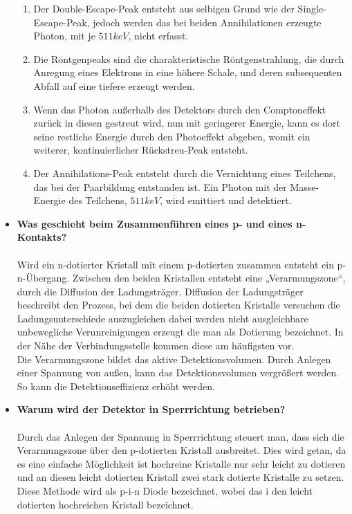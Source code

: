 \documentclass{article}
\begin{document}
\begin{itemize}
\begin{enumerate}
		\item Der Double-Escape-Peak entsteht aus selbigen Grund wie der Single-Escape-Peak, jedoch werden das bei beiden Annihilationen erzeugte Photon, mit je $511keV$, nicht erfasst.
		\item Die Röntgenpeaks sind die charakteristische Röntgenstrahlung, die durch Anregung eines Elektrons in eine höhere Schale, und deren subsequenten Abfall auf eine tiefere erzeugt werden. 
		\item Wenn das Photon außerhalb des Detektors durch den Comptoneffekt zurück in diesen gestreut wird, nun mit geringerer Energie, kann es dort seine restliche Energie durch den Photoeffekt abgeben, womit ein weiterer, kontinuierlicher Rückstreu-Peak entsteht. 
		\item Der Annihilations-Peak entsteht durch die Vernichtung eines Teilchens, das bei der Paarbildung entstanden ist. Ein Photon mit der Masse-Energie des Teilchens, $511keV$, wird emittiert und detektiert.     
	\end{enumerate}
	\item \textbf{Was geschieht beim Zusammenführen eines p- und eines n-Kontakts?}\\\\
	Wird ein n-dotierter Kristall mit einem p-dotierten zusammen entsteht ein p-n-Übergang. Zwischen den beiden Kristallen entsteht eine „Verarmungszone“, durch die Diffusion der Ladungsträger. Diffusion der Ladungsträger beschreibt den Prozess, bei dem die beiden dotierten Kristalle versuchen die Ladungsunterschiede auszugleichen dabei werden nicht ausgleichbare unbewegliche Verunreinigungen erzeugt die man als Dotierung bezeichnet. In der Nähe der Verbindungsstelle kommen diese am häufigsten vor. \\
	Die Verarmungszone bildet das aktive Detektionsvolumen. Durch Anlegen einer Spannung von außen, kann das Detektionsvolumen vergrößert werden. So kann die Detektionseffizienz erhöht werden.
	\item \textbf{Warum wird der Detektor in Sperrrichtung betrieben?}\\\\
	Durch das Anlegen der Spannung in Sperrrichtung steuert man, dass sich die Verarmungszone über den p-dotierten Kristall ausbreitet. Dies wird getan, da es eine einfache Möglichkeit ist hochreine Kristalle nur sehr leicht zu dotieren und an diesen leicht dotierten Kristall zwei stark dotierte Kristalle zu setzen. Diese Methode wird als p-i-n Diode bezeichnet, wobei das i den leicht dotierten hochreichen Kristall bezeichnet.

\end{itemize}
\end{document}

